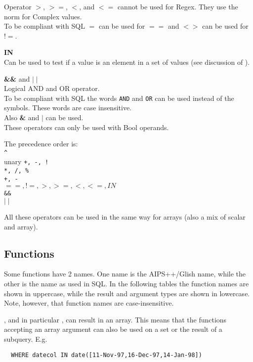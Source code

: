 \begin{description}
       Operator $>$, $>=$, $<$, and $<=$ cannot be used for Regex.
       They use the norm for Complex values.
       \\To be compliant with SQL $=$ can be used for
       $==$ and $<>$ can be used for $!=$.
  \item[] \textbf{IN}
       \\Can be used to test if a value is an element in a set of
       values (see discussion of ).
  \item[] \textbf{\&\&} and \textbf{$\mid\mid$}
       \\Logical AND and OR operator. 
       \\To be compliant with SQL the
       words \texttt{AND} and \texttt{OR} can be used instead of the
       symbols. These words are case insensitive.
       \\Also \textbf{\&} and \textbf{$\mid$} can be used.
       \\These operators can only be used with Bool operands.
\end{description}
\begin{description}
  \item The precedence order is:
       \\\verb+^+
       \\unary \texttt{+, -, !}
       \\\texttt{*, /, \%}
       \\\texttt{+, -}
       \\\texttt{$==, !=, >, >=, <, <=, IN$}
       \\\texttt{\&\&}
       \\\texttt{$\mid\mid$}
\end{description}
All these operators can be used in the same way for arrays
(also a mix of scalar and array).

\subsection{\label{TAQL:FUNCTIONS}Functions}
Some functions have 2 names. One name is the AIPS++/Glish name, while the
other is the name as used in SQL.
In the following tables the function names are shown in uppercase,
while the result and argument types are shown in lowercase.
Note, however, that function names are case-insensitive.

, and in particular
, can result in an array.
This means that the functions accepting an array argument can also
be used on a set or the result of a subquery. E.g.
\begin{verbatim}
  WHERE datecol IN date([11-Nov-97,16-Dec-97,14-Jan-98])
\end{verbatim}
